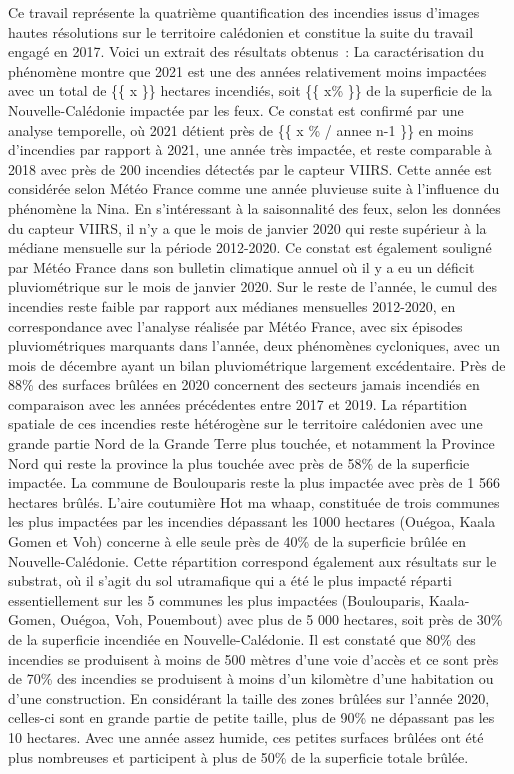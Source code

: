 \documentclass[
  11pt,
  letterpaper,
]{scrreprt}
\begin{document}
Ce travail représente la quatrième quantification des incendies issus
d'images hautes résolutions sur le territoire calédonien et constitue la
suite du travail engagé en 2017. Voici un extrait des résultats
obtenus~: La caractérisation du phénomène montre que 2021 est une des
années relativement moins impactées avec un total de \{\{ x \}\}
hectares incendiés, soit \{\{ x\% \}\} de la superficie de la
Nouvelle-Calédonie impactée par les feux. Ce constat est confirmé par
une analyse temporelle, où 2021 détient près de \{\{ x \% / annee n-1
\}\} en moins d'incendies par rapport à 2021, une année très impactée,
et reste comparable à 2018 avec près de 200 incendies détectés par le
capteur VIIRS. Cette année est considérée selon Météo France comme une
année pluvieuse suite à l'influence du phénomène la Nina. En
s'intéressant à la saisonnalité des feux, selon les données du capteur
VIIRS, il n'y a que le mois de janvier 2020 qui reste supérieur à la
médiane mensuelle sur la période 2012-2020. Ce constat est également
souligné par Météo France dans son bulletin climatique annuel où il y a
eu un déficit pluviométrique sur le mois de janvier 2020. Sur le reste
de l'année, le cumul des incendies reste faible par rapport aux médianes
mensuelles 2012-2020, en correspondance avec l'analyse réalisée par
Météo France, avec six épisodes pluviométriques marquants dans l'année,
deux phénomènes cycloniques, avec un mois de décembre ayant un bilan
pluviométrique largement excédentaire. Près de 88\% des surfaces brûlées
en 2020 concernent des secteurs jamais incendiés en comparaison avec les
années précédentes entre 2017 et 2019. La répartition spatiale de ces
incendies reste hétérogène sur le territoire calédonien avec une grande
partie Nord de la Grande Terre plus touchée, et notamment la Province
Nord qui reste la province la plus touchée avec près de 58\% de la
superficie impactée. La commune de Boulouparis reste la plus impactée
avec près de 1 566 hectares brûlés. L'aire coutumière Hot ma whaap,
constituée de trois communes les plus impactées par les incendies
dépassant les 1000 hectares (Ouégoa, Kaala Gomen et Voh) concerne à elle
seule près de 40\% de la superficie brûlée en Nouvelle-Calédonie. Cette
répartition correspond également aux résultats sur le substrat, où il
s'agit du sol utramafique qui a été le plus impacté réparti
essentiellement sur les 5 communes les plus impactées (Boulouparis,
Kaala-Gomen, Ouégoa, Voh, Pouembout) avec plus de 5 000 hectares, soit
près de 30\% de la superficie incendiée en Nouvelle-Calédonie. Il est
constaté que 80\% des incendies se produisent à moins de 500 mètres
d'une voie d'accès et ce sont près de 70\% des incendies se produisent à
moins d'un kilomètre d'une habitation ou d'une construction. En
considérant la taille des zones brûlées sur l'année 2020, celles-ci sont
en grande partie de petite taille, plus de 90\% ne dépassant pas les 10
hectares. Avec une année assez humide, ces petites surfaces brûlées ont
été plus nombreuses et participent à plus de 50\% de la superficie
totale brûlée.
\end{document}

